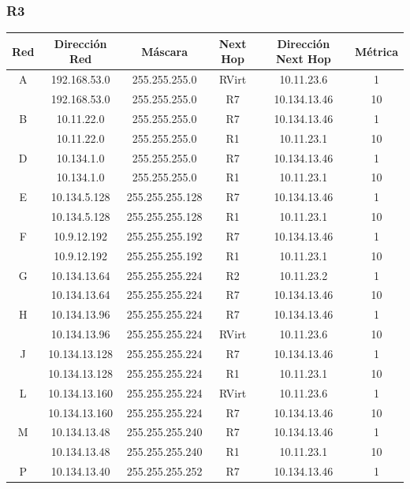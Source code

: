 \documentclass[12pt, a4paper, spanish]{article}
\begin{document}
\subsubsection{R3}
\begin{center}
\begin{tabular}{|c|c|c|c|c|c|}
	\hline
	Red & Dirección Red & Máscara & Next Hop & Dirección Next Hop & Métrica \\
	\hline
	\hline
	A & 192.168.53.0 & 255.255.255.0 & RVirt & 10.11.23.6 & 1\\
	 & 192.168.53.0 & 255.255.255.0 & R7 & 10.134.13.46 & 10\\
	\hline
	B & 10.11.22.0 & 255.255.255.0 & R7 & 10.134.13.46 & 1\\
	 & 10.11.22.0 & 255.255.255.0 & R1 & 10.11.23.1 & 10\\
	\hline
	D & 10.134.1.0 & 255.255.255.0 & R7 & 10.134.13.46 & 1\\
	 & 10.134.1.0 & 255.255.255.0 & R1 & 10.11.23.1 & 10\\
	\hline
	E & 10.134.5.128 & 255.255.255.128 & R7 & 10.134.13.46 & 1\\
	 & 10.134.5.128 & 255.255.255.128 & R1 & 10.11.23.1 & 10\\
	\hline
	F & 10.9.12.192 & 255.255.255.192 & R7 & 10.134.13.46 & 1\\
	 & 10.9.12.192 & 255.255.255.192 & R1 & 10.11.23.1 & 10\\
	\hline
	G & 10.134.13.64 & 255.255.255.224 & R2 & 10.11.23.2 & 1\\
	 & 10.134.13.64 & 255.255.255.224 & R7 & 10.134.13.46 & 10\\
	\hline
	H & 10.134.13.96 & 255.255.255.224 & R7 & 10.134.13.46 & 1\\
	 & 10.134.13.96 & 255.255.255.224 & RVirt & 10.11.23.6 & 10\\
	\hline
	J & 10.134.13.128 & 255.255.255.224 & R7 & 10.134.13.46 & 1\\
	 & 10.134.13.128 & 255.255.255.224 & R1 & 10.11.23.1 & 10\\
	\hline
	L & 10.134.13.160 & 255.255.255.224 & RVirt & 10.11.23.6 & 1\\
	 & 10.134.13.160 & 255.255.255.224 & R7 & 10.134.13.46 & 10\\
	\hline
	M & 10.134.13.48 & 255.255.255.240 & R7 & 10.134.13.46 & 1\\
	 & 10.134.13.48 & 255.255.255.240 & R1 & 10.11.23.1 & 10\\
	\hline
	P & 10.134.13.40 & 255.255.255.252 & R7 & 10.134.13.46 & 1\\

\end{tabular}
\end{center}
\end{document}
